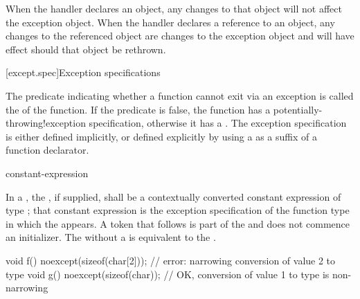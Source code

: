 \pnum
When the handler declares an object,
any changes to that object will not affect the exception object.
When the handler declares a reference to an object,
any changes to the referenced object are changes to the
exception object and will have effect should that object be rethrown.%
%

[except.spec]{Exception specifications}%

\pnum
The predicate indicating whether a function cannot exit via an exception
is called the  of the function.
If the predicate is false,
the function has a
%
%
{potentially-throwing!exception specification},
otherwise it has a
%
.
The exception specification is either defined implicitly,
or defined explicitly
by using a 
as a suffix of a function declarator.

\begin{bnf}
\br
     \terminal{(} constant-expression \terminal{)}\br
\end{bnf}

\pnum
{}%
In a , the ,
if supplied, shall be a contextually converted constant expression
of type ;
that constant expression is the exception specification of
the function type in which the  appears.
A \tcode{(} token that follows  is part of the
 and does not commence an
initializer.
The  
without a 
is
equivalent to the 
.
\begin{example}
\begin{codeblock}
void f() noexcept(sizeof(char[2])); // error: narrowing conversion of value 2 to type 
void g() noexcept(sizeof(char));    // OK, conversion of value 1 to type  is non-narrowing
\end{codeblock}
\end{example}

